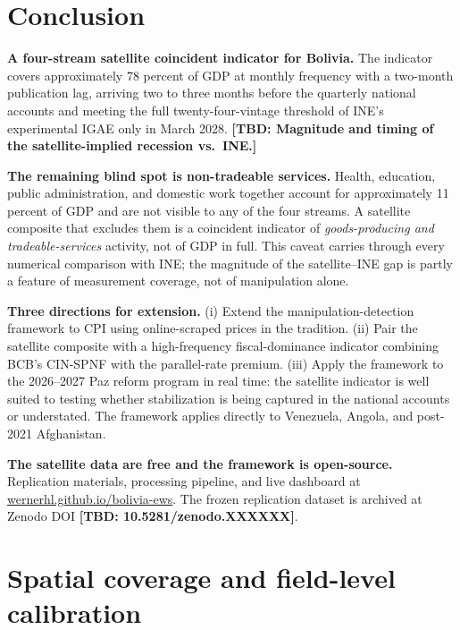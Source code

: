 \documentclass[11pt,letterpaper]{article}
\newcommand{\tbdline}[1]{\textcolor{yellow!60!black}{\textbf{[TBD: #1]}}}
\newcommand{\claim}[1]{\textbf{#1.}}
\begin{document}
\section{Conclusion}
\label{sec:conclusion}

\claim{A four-stream satellite coincident indicator for Bolivia} The indicator covers approximately \num{78} percent of GDP at monthly frequency with a two-month publication lag, arriving two to three months before the quarterly national accounts and meeting the full twenty-four-vintage threshold of INE's experimental IGAE only in March \num{2028}. \tbdline{Magnitude and timing of the satellite-implied recession vs.\ INE.}

\claim{The remaining blind spot is non-tradeable services} Health, education, public administration, and domestic work together account for approximately \num{11} percent of GDP and are not visible to any of the four streams. A satellite composite that excludes them is a coincident indicator of \emph{goods-producing and tradeable-services} activity, not of GDP in full. This caveat carries through every numerical comparison with INE; the magnitude of the satellite--INE gap is partly a feature of measurement coverage, not of manipulation alone.

\claim{Three directions for extension} (i) Extend the manipulation-detection framework to CPI using online-scraped prices in the \citet{cavallo2013} tradition. (ii) Pair the satellite composite with a high-frequency fiscal-dominance indicator combining BCB's CIN-SPNF with the parallel-rate premium. (iii) Apply the framework to the \numrange{2026}{2027} Paz reform program in real time: the satellite indicator is well suited to testing whether stabilization is being captured in the national accounts or understated. The framework applies directly to Venezuela, Angola, and post-\num{2021} Afghanistan.

\claim{The satellite data are free and the framework is open-source} Replication materials, processing pipeline, and live dashboard at \url{wernerhl.github.io/bolivia-ews}. The frozen replication dataset is archived at Zenodo DOI \tbdline{10.5281/zenodo.XXXXXX}.

\appendix

\section{Spatial coverage and field-level calibration}
\label{app:spatial}
\end{document}
